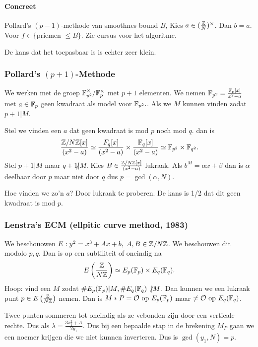 \paragraph{Concreet} Pollard's $(p-1)$-methode van smoothnes bound $B$, 
Kies $a \in (\frac{\mathbb{Z}}{N})^{\times }$. 
Dan $b = a$. 
Voor $f \in \{\text{priemen }\le B\} $. 
Zie cursus voor het algoritme.

De kans dat het toepasbaar is is echter zeer klein. 

\subsubsection{Pollard's $(p+1)$-Methode} \label{sec:pollard's_$(p+1)$-methode}

We werken met de groep $\mathbb{F}^{\times }_{p^2} / \mathbb{F}^{\times }_p$ met $p + 1$ elementen.
We nemen $\mathbb{F}_{p^2} = \frac{\mathbb{F}_p[x]}{x^2 -a}$ met $a \in \mathbb{F}_p$ geen kwadraat als model voor $\mathbb{F}_{p^2}.$.
Als we $M$ kunnen vinden zodat $p + 1 | M$. 

Stel we vinden een $a$ dat geen kwadraat is mod $p$ noch mod $q. $ dan is
 \[
	 \frac{\mathbb{Z} / N\mathbb{Z} [x]}{(x^2 - a)} \simeq \frac{F_q[x]}{(x^2 - a)} \times  \frac{\mathbb{F}_q[x]}{(x^2-a)} \simeq \mathbb{F}_{p^2}\times  \mathbb{F}_{q^2}
.\] 
Stel $p + 1 | M$ maar $q + 1 \not | M$. 
Kies $B \in \frac{\mathbb{Z} / N \mathbb{Z} [x]}{(x^2 - a)} $ lukraak.
Als $b^{M} = \alpha x + \beta$  dan is $\alpha$ deelbaar door $p$ maar niet door $q$ dus  $p = \gcd(\alpha, N)$.

\begin{opmerking}
	Hoe vinden we zo'n $a$?
	Door lukraak te proberen. De kans is 1/2 dat dit geen kwadraat is mod $p$. 
\end{opmerking}

\subsubsection{Lenstra's ECM (ellpitic curve method, 1983)} \label{sec:lenstra's_ecm_(ellpitic_curve_method,_1983)}

We beschouowen $E: y^2 = x^3 + A x + b,\; A, B \in \mathbb{Z} / N \mathbb{Z}$.
We beschouwen dit modolo $p, q$. 
Dan is op een subtiliteit of oneindig na 
\[
	E\left( \frac{\mathbb{Z}}{N\mathbb{Z}} \right) \simeq E_p(\mathbb{F}_p) \times E_q(\mathbb{F}_q) 
.\] 
Hoop: vind een $M$ zodat $\# E_p(\mathbb{F}_p) | M, \# E_q(\mathbb{F}_q) \not |M$. 
Dan kunnen we een lukraak punt  $p \in E\left( \frac{\mathbb{Z}}{N\mathbb{Z}} \right) $ nemen. Dan is $M*P = \mathcal{O}  \text{ op }E_p(\mathbb{F}_p) $ maar $\ne \mathcal{O}  \text{ op } E_q(\mathbb{F}_q)$.

Twee punten sommeren tot oneindig als ze vebonden zijn door een verticale rechte. 
Dus als $\lambda = \frac{3x_1^2 + A}{2y_1}$. 
Dus bij een bepaalde stap in de brekening $M_P$ gaan we een noemer krijgen die we niet kunnen inverteren. Dus is $\gcd(y_1, N) = p$. 

